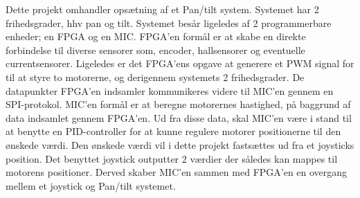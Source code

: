 Dette projekt omhandler opsætning af et Pan/tilt system. Systemet har 2 frihedsgrader, hhv pan og tilt. Systemet besår ligeledes af 2 programmerbare enheder; en FPGA og en MIC. FPGA’en formål er at skabe en direkte forbindelse til diverse sensorer som, encoder, hallsensorer og eventuelle currentsensorer. Ligeledes er det FPGA’ens opgave at generere et PWM signal for til at styre to motorerne, og derigennem systemets 2 frihedsgrader. De datapunkter FPGA’en indsamler kommunikeres videre til MIC’en gennem en SPI-protokol. MIC’en formål er at beregne motorernes hastighed, på baggrund af data indsamlet gennem FPGA’en. Ud fra disse data, skal MIC’en være i stand til at benytte en PID-controller for at kunne regulere motorer positionerne til den ønskede værdi. Den ønskede værdi vil i dette projekt fastsættes ud fra et joysticks position. Det benyttet joystick outputter 2 værdier der således kan mappes til motorens positioner. Derved skaber MIC’en sammen med FPGA’en en overgang mellem et joystick og Pan/tilt systemet.